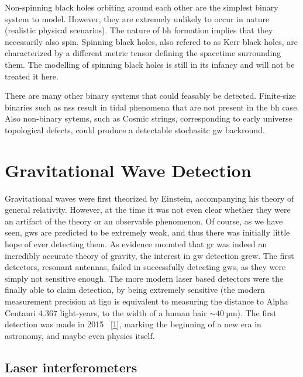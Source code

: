 \documentclass[
  11pt,
  a4paper,
  DIV=11,
  numbers=noendperiod,
  twoside]{scrreprt}
\DeclareRobustCommand{\[}{\begin{equation}}
\DeclareRobustCommand{\]}{\end{equation}}
\begin{document}
Non-spinning black holes orbiting around each other are the simplest
binary system to model. However, they are extremely unlikely to occur in
nature (realistic physical scenarios). The nature of \gls{bh} formation
implies that they necessarily also spin. Spinning black holes, also
refered to as Kerr black holes, are characterized by a different metric
tensor defining the spacetime surrounding them. The modelling of
spinning black holes is still in its infancy and will not be treated it
here.

There are many other binary systems that could feasably be detected.
Finite-size binaries such as \glspl{ns} result in tidal phenomena that
are not present in the \gls{bh} case. Also non-binary sytems, such as
Cosmic strings, corresponding to early universe topological defects,
could produce a detectable stochasitc \gls{gw} backround.


\hypertarget{sec-gwdetect}{%
\chapter{Gravitational Wave Detection}\label{sec-gwdetect}}

Gravitational waves were first theorized by Einstein, accompanying his
theory of general relativity. However, at the time it was not even clear
whether they were an artifact of the theory or an observable phenomenon.
Of course, as we have seen, \glspl{gw} are predicted to be extremely
weak, and thus there was initially little hope of ever detecting them.
As evidence mounted that \gls{gr} was indeed an incredibly accurate
theory of gravity, the interest in \gls{gw} detection grew. The first
detectors, resonant antennas, failed in successfully detecting
\glspl{gw}, as they were simply not sensitive enough. The more modern
laser based detectors were the finally able to claim detection, by being
extremely sensitive (the modern measurement precision at \gls{ligo} is
equivalent to measuring the distance to Alpha Centauri 4.367
light-years, to the width of a human hair \(\sim 40~\mathrm{µm}\)). The
first detection was made in 2015
~{[}\protect\hyperlink{ref-LIGOScientific:2016aoc}{1}{]}, marking the
beginning of a new era in astronomy, and maybe even physics itself.

\hypertarget{laser-interferometers}{%
\section{Laser interferometers}\label{laser-interferometers}}
\end{document}
